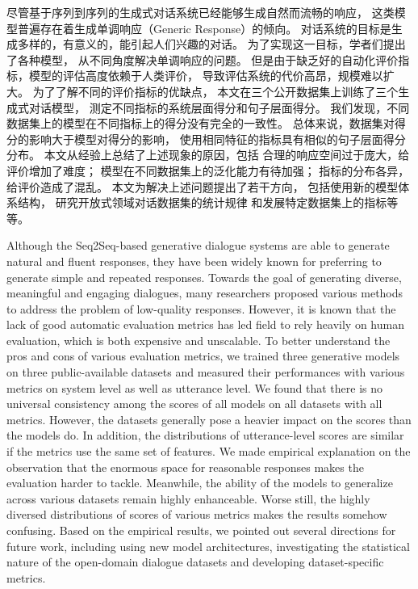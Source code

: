 
\begin{cabstract}
    尽管基于序列到序列的生成式对话系统已经能够生成自然而流畅的响应，
    这类模型普遍存在着生成单调响应（Generic Response）的倾向。
    对话系统的目标是生成多样的，有意义的，能引起人们兴趣的对话。
    为了实现这一目标，学者们提出了各种模型，
    从不同角度解决单调响应的问题。
    但是由于缺乏好的自动化评价指标，模型的评估高度依赖于人类评价，
    导致评估系统的代价高昂，规模难以扩大。
    为了了解不同的评价指标的优缺点，
    本文在三个公开数据集上训练了三个生成式对话模型，
    测定不同指标的系统层面得分和句子层面得分。
    我们发现，不同数据集上的模型在不同指标上的得分没有完全的一致性。
    总体来说，数据集对得分的影响大于模型对得分的影响，
    使用相同特征的指标具有相似的句子层面得分分布。
    本文从经验上总结了上述现象的原因，包括
    合理的响应空间过于庞大，给评价增加了难度；
    模型在不同数据集上的泛化能力有待加强；
    指标的分布各异，给评价造成了混乱。
    本文为解决上述问题提出了若干方向，
    包括使用新的模型体系结构，
    研究开放式领域对话数据集的统计规律
    和发展特定数据集上的指标等等。
\end{cabstract}

\begin{eabstract}
    Although the Seq2Seq-based generative dialogue systems are
    able to generate natural and
    fluent responses,
    they have been widely known for preferring to generate
    simple and repeated responses.
    Towards the goal of generating diverse, meaningful and
    engaging dialogues,
    many researchers proposed various methods to address the
    problem of low-quality responses.
    However, it is known that the
    lack of good automatic evaluation metrics
    has led field to rely heavily on human evaluation,
    which is both expensive and unscalable.
    To better understand the pros and cons of various
    evaluation metrics,
    we trained three generative models on
    three public-available datasets and measured their
    performances with various metrics on system level
    as well as utterance level.
    We found that there is no universal consistency among
    the scores of all models on all datasets with all metrics.
    However, the datasets generally pose a heavier impact on
    the scores than the models do.
    In addition, the distributions of
    utterance-level scores are similar if the metrics use the same
    set of features.
    We made empirical explanation on the
    observation that the enormous space for reasonable responses
    makes the evaluation harder to tackle.
    Meanwhile, the ability of the models to generalize across
    various datasets remain highly enhanceable.
    Worse still, the highly diversed distributions of scores
    of various metrics makes the results somehow confusing.
    Based on the empirical results, we pointed out several
    directions for future work, including using new model
    architectures, investigating the statistical nature of
    the open-domain dialogue datasets and
    developing dataset-specific metrics.
\end{eabstract}

